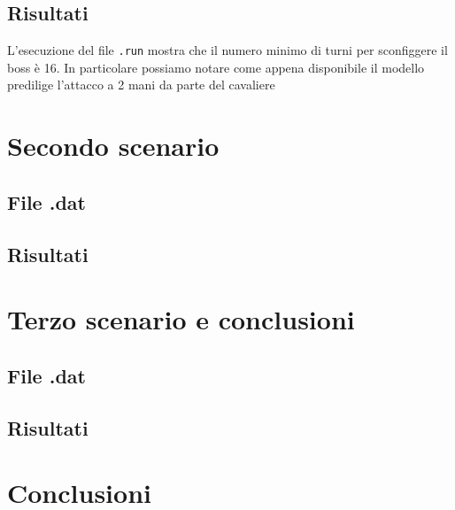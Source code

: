 \documentclass[12pt]{article}
\begin{document}
\subsection{Risultati}
L’esecuzione del file \texttt{.run} mostra che il numero minimo di turni per sconfiggere il boss è 16. In particolare possiamo notare come appena disponibile il modello predilige l'attacco a 2 mani da parte del cavaliere\\
\section{Secondo scenario}
\subsection{File .dat}
\subsection{Risultati}

\section{Terzo scenario e conclusioni}
\subsection{File .dat}
\subsection{Risultati}

\section{Conclusioni}
\end{document}
